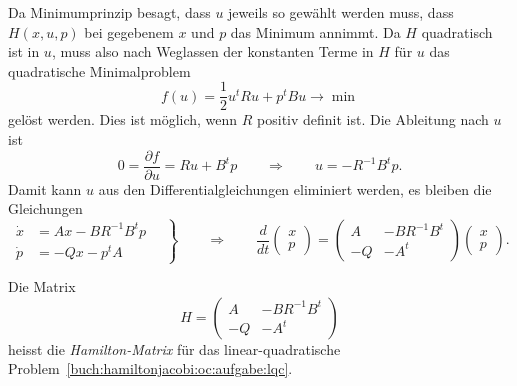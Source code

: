 Da  Minimumprinzip besagt, dass $u$ jeweils so gewählt werden muss,
dass $H(x,u,p)$ bei gegebenem $x$ und $p$ das Minimum annimmt.
Da $H$ quadratisch ist in $u$, muss also nach Weglassen der konstanten
Terme in $H$ für $u$ das quadratische Minimalproblem
\[
f(u)
=
\frac12 u^t R u + p^t Bu
\to
\min
\]
gelöst werden.
Dies ist möglich, wenn $R$ positiv definit ist.
Die Ableitung nach $u$ ist
\[
0
=
\frac{\partial f}{\partial u}
=
Ru + B^tp
\qquad\Rightarrow\qquad
u
=
-
R^{-1}B^t p.
\]
Damit kann $u$ aus den Differentialgleichungen eliminiert werden, 
es bleiben die Gleichungen
\begin{equation}
\left.
\begin{aligned}
\dot{x}
&=
Ax-BR^{-1}B^t p
\\
\dot{p}
&=
-Qx -p^tA
\end{aligned}
\quad
\right\}
\qquad\Rightarrow\qquad
\frac{d}{dt}
\begin{pmatrix}
x\\
p
\end{pmatrix}
=
\begin{pmatrix}
 A & -BR^{-1}B^t \\
-Q & -A^t
\end{pmatrix}
\begin{pmatrix}
x\\
p
\end{pmatrix}.
\end{equation}

\begin{definition}
Die Matrix
\[
H
=
\begin{pmatrix}
 A & -BR^{-1}B^t \\
-Q & -A^t
\end{pmatrix}
\]
heisst die {\em Hamilton-Matrix} für das linear-quadratische
Problem~\ref{buch:hamiltonjacobi:oc:aufgabe:lqc}.
\end{definition}

